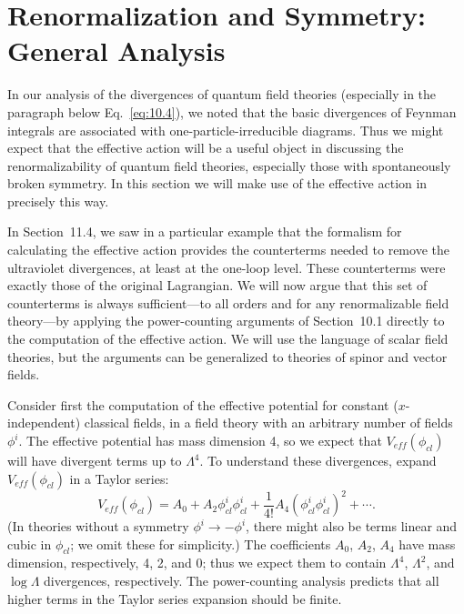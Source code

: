 \section{Renormalization and Symmetry: General Analysis}

In our analysis of the divergences of quantum field theories (especially in
the paragraph below Eq.~\eqref{eq:10.4}), we noted that the basic divergences
of Feynman integrals are associated with one-particle-irreducible diagrams.
Thus we might expect that the effective action will be a useful object in
discussing the renormalizability of quantum field theories, especially those
with spontaneously broken symmetry.  In this section we will make use of the
effective action in precisely this way.

In Section~11.4, we saw in a particular example that the formalism for
calculating the effective action provides the counterterms needed to remove
the ultraviolet divergences, at least at the one-loop level.  These
counterterms were exactly those of the original Lagrangian.  We will now argue
that this set of counterterms is always sufficient---to all orders and for any
renormalizable field theory---by applying the power-counting arguments of
Section~10.1 directly to the computation of the effective action.  We will use
the language of scalar field theories, but the arguments can be generalized to
theories of spinor and vector fields.

Consider first the computation of the effective potential for constant
($x$-independent) classical fields, in a field theory with an arbitrary number
of fields $\phi^i$.  The effective potential has mass dimension 4, so we expect
that $V_{eff}(\phi_{cl})$ will have divergent terms up to $\Lambda^4$.  To
understand these divergences, expand $V_{eff}(\phi_{cl})$ in a Taylor series:
\begin{equation}
  V_{eff}(\phi_{cl}) = A_0 + A_2\phi_{cl}^i\phi_{cl}^i
    + \frac{1}{4!}A_4(\phi_{cl}^i\phi_{cl}^i)^2 + \cdots .
\end{equation}
(In theories without a symmetry $\phi^i\to-\phi^i$, there might also be terms
linear and cubic in $\phi_{cl}$; we omit these for simplicity.)  The
coefficients $A_0$, $A_2$, $A_4$ have mass dimension, respectively, 4, 2, and
0; thus we expect them to contain $\Lambda^4$, $\Lambda^2$, and $\log\Lambda$
divergences, respectively.  The power-counting analysis predicts that all
higher terms in the Taylor series expansion should be finite.

